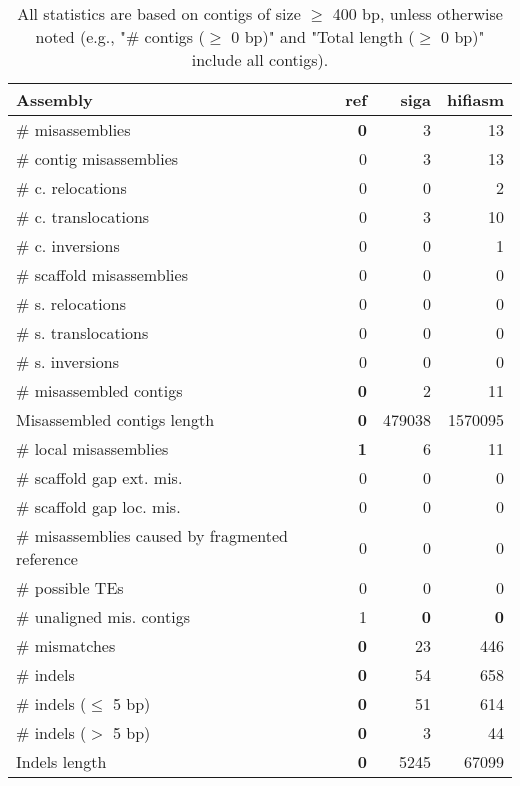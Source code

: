 \documentclass[12pt,a4paper]{article}
\begin{document}
\begin{table}[ht]
\begin{center}
\caption{All statistics are based on contigs of size $\geq$ 400 bp, unless otherwise noted (e.g., "\# contigs ($\geq$ 0 bp)" and "Total length ($\geq$ 0 bp)" include all contigs).}
\begin{tabular}{|l*{3}{|r}|}
\hline
Assembly & ref & siga & hifiasm \\ \hline
\# misassemblies & {\bf 0} & 3 & 13 \\ \hline
\hspace{2mm}\# contig misassemblies & 0 & 3 & 13 \\ \hline
\hspace{5mm}\# c. relocations & 0 & 0 & 2 \\ \hline
\hspace{5mm}\# c. translocations & 0 & 3 & 10 \\ \hline
\hspace{5mm}\# c. inversions & 0 & 0 & 1 \\ \hline
\hspace{2mm}\# scaffold misassemblies & 0 & 0 & 0 \\ \hline
\hspace{5mm}\# s. relocations & 0 & 0 & 0 \\ \hline
\hspace{5mm}\# s. translocations & 0 & 0 & 0 \\ \hline
\hspace{5mm}\# s. inversions & 0 & 0 & 0 \\ \hline
\# misassembled contigs & {\bf 0} & 2 & 11 \\ \hline
Misassembled contigs length & {\bf 0} & 479038 & 1570095 \\ \hline
\# local misassemblies & {\bf 1} & 6 & 11 \\ \hline
\# scaffold gap ext. mis. & 0 & 0 & 0 \\ \hline
\# scaffold gap loc. mis. & 0 & 0 & 0 \\ \hline
\# misassemblies caused by fragmented reference & 0 & 0 & 0 \\ \hline
\# possible TEs & 0 & 0 & 0 \\ \hline
\# unaligned mis. contigs & 1 & {\bf 0} & {\bf 0} \\ \hline
\# mismatches & {\bf 0} & 23 & 446 \\ \hline
\# indels & {\bf 0} & 54 & 658 \\ \hline
\hspace{5mm}\# indels ($\leq$ 5 bp) & {\bf 0} & 51 & 614 \\ \hline
\hspace{5mm}\# indels ($>$ 5 bp) & {\bf 0} & 3 & 44 \\ \hline
Indels length & {\bf 0} & 5245 & 67099 \\ \hline
\end{tabular}
\end{center}
\end{table}
\end{document}
